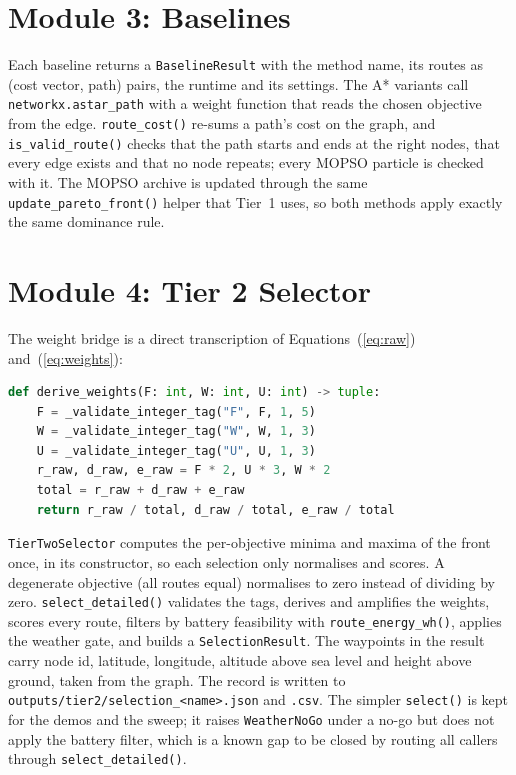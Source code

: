 \documentclass{ssnreview}
\begin{document}
\section{Module 3: Baselines}

Each baseline returns a \texttt{BaselineResult} with the method name, its routes as
(cost vector, path) pairs, the runtime and its settings. The A* variants call
\texttt{networkx.astar\_path} with a weight function that reads the chosen objective from
the edge. \texttt{route\_cost()} re-sums a path's cost on the graph, and
\texttt{is\_valid\_route()} checks that the path starts and ends at the right nodes, that
every edge exists and that no node repeats; every MOPSO particle is checked with it. The
MOPSO archive is updated through the same \texttt{update\_pareto\_front()} helper that
Tier~1 uses, so both methods apply exactly the same dominance rule.

\section{Module 4: Tier 2 Selector}

The weight bridge is a direct transcription of Equations~(\ref{eq:raw})
and~(\ref{eq:weights}):

\begin{lstlisting}[language=Python, caption={Weight derivation (module4\_tier2\_payload.py)}, label={lst:weights}]
def derive_weights(F: int, W: int, U: int) -> tuple:
    F = _validate_integer_tag("F", F, 1, 5)
    W = _validate_integer_tag("W", W, 1, 3)
    U = _validate_integer_tag("U", U, 1, 3)
    r_raw, d_raw, e_raw = F * 2, U * 3, W * 2
    total = r_raw + d_raw + e_raw
    return r_raw / total, d_raw / total, e_raw / total
\end{lstlisting}

\texttt{TierTwoSelector} computes the per-objective minima and maxima of the front once,
in its constructor, so each selection only normalises and scores. A degenerate objective
(all routes equal) normalises to zero instead of dividing by zero.
\texttt{select\_detailed()} validates the tags, derives and amplifies the weights, scores
every route, filters by battery feasibility with \texttt{route\_energy\_wh()}, applies the
weather gate, and builds a \texttt{SelectionResult}. The waypoints in the result carry
node id, latitude, longitude, altitude above sea level and height above ground, taken
from the graph. The record is written to \texttt{outputs/tier2/selection\_<name>.json} and
\texttt{.csv}. The simpler \texttt{select()} is kept for the demos and the sweep; it raises
\texttt{WeatherNoGo} under a no-go but does not apply the battery filter, which is a known
gap to be closed by routing all callers through \texttt{select\_detailed()}.
\end{document}
